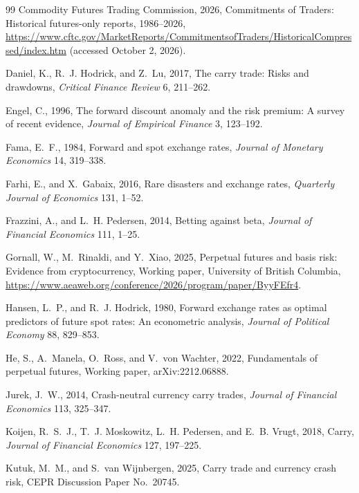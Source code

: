 \documentclass[11pt]{article}
\begin{document}
\begin{thebibliography}{99}
Commodity Futures Trading Commission, 2026, Commitments of Traders: Historical futures-only reports, 1986--2026, \url{https://www.cftc.gov/MarketReports/CommitmentsofTraders/HistoricalCompressed/index.htm} (accessed October 2, 2026).

Daniel, K., R.~J. Hodrick, and Z.~Lu, 2017, The carry trade: Risks and drawdowns, \textit{Critical Finance Review} 6, 211--262.

Engel, C., 1996, The forward discount anomaly and the risk premium: A survey of recent evidence, \textit{Journal of Empirical Finance} 3, 123--192.

Fama, E.~F., 1984, Forward and spot exchange rates, \textit{Journal of Monetary Economics} 14, 319--338.

Farhi, E., and X.~Gabaix, 2016, Rare disasters and exchange rates, \textit{Quarterly Journal of Economics} 131, 1--52.

Frazzini, A., and L.~H. Pedersen, 2014, Betting against beta, \textit{Journal of Financial Economics} 111, 1--25.

Gornall, W., M.~Rinaldi, and Y.~Xiao, 2025, Perpetual futures and basis risk: Evidence from cryptocurrency, Working paper, University of British Columbia, \url{https://www.aeaweb.org/conference/2026/program/paper/ByyFEfr4}.

Hansen, L.~P., and R.~J. Hodrick, 1980, Forward exchange rates as optimal predictors of future spot rates: An econometric analysis, \textit{Journal of Political Economy} 88, 829--853.

He, S., A.~Manela, O.~Ross, and V.~von Wachter, 2022, Fundamentals of perpetual futures, Working paper, arXiv:2212.06888.

Jurek, J.~W., 2014, Crash-neutral currency carry trades, \textit{Journal of Financial Economics} 113, 325--347.

Koijen, R.~S.~J., T.~J. Moskowitz, L.~H. Pedersen, and E.~B. Vrugt, 2018, Carry, \textit{Journal of Financial Economics} 127, 197--225.

Kutuk, M.~M., and S.~van Wijnbergen, 2025, Carry trade and currency crash risk, CEPR Discussion Paper No.~20745.


\end{thebibliography}
\end{document}
